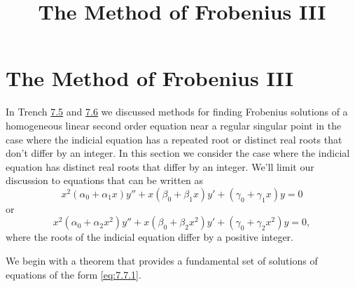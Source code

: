 \documentclass{ximera}
\title{The Method of Frobenius III}%
\begin{document}
\begin{abstract}

\end{abstract}

\maketitle

\section*{The Method of Frobenius III}

In Trench \href{https://ximera.osu.edu/ode/main/frobeniusI/frobeniusI}{7.5} and \href{https://ximera.osu.edu/ode/main/frobeniusII/frobeniusII}{7.6} we discussed methods
for finding
Frobenius solutions of a homogeneous linear second order equation near
a regular singular point in the case where the indicial equation has a
repeated root or distinct real roots that don't differ by an integer.
In this section we consider the case where the indicial equation has
distinct real roots that differ by an integer. We'll limit our
discussion to equations that can be written as
\begin{equation} \label{eq:7.7.1}
x^2(\alpha_0+\alpha_1x)y''+x(\beta_0+\beta_1x)y'
+(\gamma_0+\gamma_1x)y=0
\end{equation}
or
$$
x^2(\alpha_0+\alpha_2x^2)y''+x(\beta_0+\beta_2x^2)y'
+(\gamma_0+\gamma_2x^2)y=0,
$$
where the roots of the indicial equation differ by a positive integer.

We begin with a theorem that provides a fundamental set of solutions
of equations of the form \eqref{eq:7.7.1}.
\end{document}
